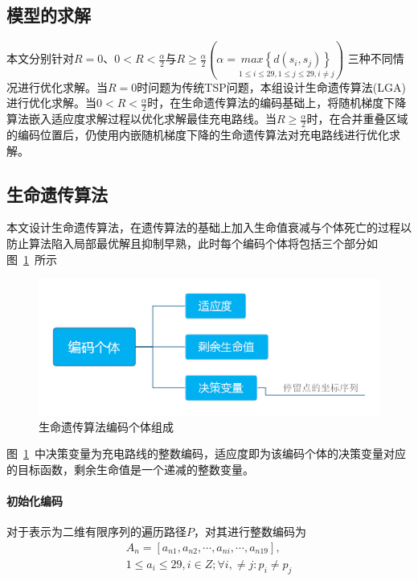 \documentclass{whutmod}
\begin{document}
		\subsection{模型的求解}
		本文分别针对$R=0$、$0<R<\frac{\alpha }{2}$与$R\geqslant\frac{\alpha }{2} (\alpha =\underset{1\leqslant i\leqslant 29,1\leqslant j\leqslant 29,i\neq j}{max\left \{ d(s_i,s_j) \right \}}) $
		三种不同情况进行优化求解。当$R=0$时问题为传统TSP问题，本组设计生命遗传算法(LGA)进行优化求解。当$0<R<\frac{\alpha }{2}$时，在生命遗传算法的编码基础上，将随机梯度下降算法嵌入适应度求解过程以优化求解最佳充电路线。当$R\geqslant\frac{\alpha }{2}$时，在合并重叠区域的编码位置后，仍使用内嵌随机梯度下降的生命遗传算法对充电路线进行优化求解。
		
		\subsection{生命遗传算法}
		本文设计生命遗传算法，在遗传算法的基础上加入生命值衰减与个体死亡的过程以防止算法陷入局部最优解且抑制早熟，此时每个编码个体将包括三个部分如图~\ref{saf}~所示
		\begin{figure}[H]
			\centering
			\includegraphics[width=\textwidth]{figures/lga.png}
			\caption{生命遗传算法编码个体组成}\label{saf}
		\end{figure}
		
		图~\ref{saf}~中决策变量为充电路线的整数编码，适应度即为该编码个体的决策变量对应的目标函数，剩余生命值是一个递减的整数变量。
		 \paragraph{初始化编码}
		对于表示为二维有限序列的遍历路径$P$，对其进行整数编码为
		\begin{gather*}
		A_n=[a_{n1},a_{n2},\cdots,a_{ni},\cdots,a_{n19}], \\
		1\leqslant a_i \leqslant 29 ,i\in Z ;\forall i, \neq j:p_i \neq p_j 
		\end{gather*}
		
\end{document}
